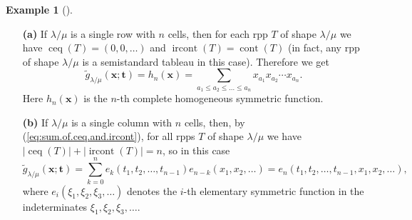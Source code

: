 \documentclass[numbers=enddot,12pt,final,onecolumn,notitlepage]{scrartcl}%
\theoremstyle{definition}
\newtheorem{exmp}[theo]{Example}
\newenvironment{example}[1][]
{\begin{exmp}[#1]\begin{leftbar}}
{\end{leftbar}\end{exmp}}
\let\sumnonlimits\sum
\renewcommand{\sum}{\sumnonlimits\limits}
\def\ceq{{\operatorname{ceq}}}
\def\ircont{{\operatorname{ircont}}}
\def\cont{{\operatorname{cont}}}
\def\g{{\widetilde{g}}}
\def\t{{\mathbf{t}}}
\def\x{{\mathbf{x}}}
\def\lm{{\lambda/\mu}}
\begin{document}
\begin{example}
\label{exa.gtilde.1}

\begin{enumerate}

\item[\textbf{(a)}] If $\lm$ is a single row with $n$ cells, then for each rpp $T$ of shape $\lm$ we have $\ceq(T)=(0,0,\dots)$ and $\ircont(T)=\cont(T)$ (in fact, any rpp of shape $\lm$ is a semistandard tableau in this case). Therefore we get 
\[
\g_\lm(\x;\t)=h_n(\x)=\sum_{a_1\leq a_2\leq\dots\leq a_n} x_{a_1}x_{a_2}\cdots x_{a_n}.
\]
 Here $h_n(\x)$ is the $n$-th complete homogeneous symmetric function.


\item[\textbf{(b)}] If $\lm$ is a single column with $n$ cells, then, by (\ref{eq:sum.of.ceq.and.ircont}), for all rpps $T$ of shape $\lm$ we have $|\ceq(T)|+|\ircont(T)|=n$, so in this case
\[
\g_\lm(\x;\t)=\sum_{k=0}^{n}e_{k}\left(  t_{1},t_{2},\ldots,t_{n-1}\right)
e_{n-k}\left(  x_{1},x_{2},\ldots\right) =e_n(t_1,t_2,\dots,t_{n-1},x_1,x_2,\dots),
\]
where $e_{i}\left(  \xi_{1},\xi_{2},\xi_{3},\ldots\right)  $ denotes the
$i$-th elementary symmetric function in the indeterminates $\xi_{1},\xi
_{2},\xi_{3},\ldots$. 



\end{enumerate}
\end{example}
\end{document}
